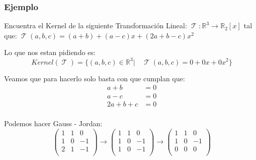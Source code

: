 \documentclass[12pt]{report}                                %
\DeclareMathOperator \LinealTransformation {\mathcal{T}}
\begin{document}
            \clearpage
            \subsubsection{Ejemplo}
            Encuentra el Kernel de la siguiente Transformación Lineal:
            $\LinealTransformation : \mathbb{R}^3 \to \mathbb{R}_2[x]$ tal que: 
            $\LinealTransformation(a,b,c) = (a+b) + (a-c)x + (2a+b-c)x^2$

            Lo que nos estan pidiendo es:
            \begin{equation*}
                Kernel(\LinealTransformation) = 
                \{(a,b,c)\in \mathbb{R}^3 |\quad \LinealTransformation(a,b,c) = 0+0x+0x^2\}
            \end{equation*}

            Veamos que para hacerlo solo basta con que cumplan que:
            \begin{equation*}
            \begin{split}
                a + b       & = 0 \\
                a - c       & = 0 \\
                2a + b + c  & = 0 \\
            \end{split}
            \end{equation*}

            Podemos hacer Gauss - Jordan:
            \begin{equation*}
                \begin{pmatrix} 1&1&0 \\ 1&0&-1 \\ 2&1&-1 \\\end{pmatrix} \to
                \begin{pmatrix} 1&1&0 \\ 1&0&-1 \\ 1&0&-1 \\\end{pmatrix} \to
                \begin{pmatrix} 1&1&0 \\ 1&0&-1 \\ 0&0&0  \\\end{pmatrix}
            \end{equation*}
\end{document}
